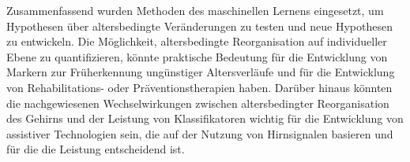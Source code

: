 Zusammenfassend wurden Methoden des maschinellen Lernens eingesetzt, um Hypothesen über altersbedingte Veränderungen zu testen und neue Hypothesen zu entwickeln. Die Möglichkeit, altersbedingte Reorganisation auf individueller Ebene zu quantifizieren, könnte praktische Bedeutung für die Entwicklung von Markern zur Früherkennung ungünstiger Altersverläufe und für die Entwicklung von Rehabilitations- oder Präventionstherapien haben. Darüber hinaus könnten die nachgewiesenen Wechselwirkungen zwischen altersbedingter Reorganisation des Gehirns und der Leistung von Klassifikatoren wichtig für die Entwicklung von assistiver Technologien sein, die auf der Nutzung von Hirnsignalen basieren und für die die Leistung entscheidend ist.

